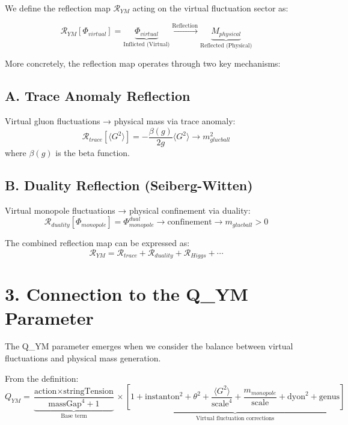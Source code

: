 \documentclass[11pt]{article}
\begin{document}
We define the reflection map $\mathcal{R}_{YM}$ acting on the virtual fluctuation sector as:

\[
\mathcal{R}_{YM}[\Phi_{virtual}] = \underbrace{\Phi_{virtual}}_{\text{Inflicted (Virtual)}} \xrightarrow{\text{Reflection}} \underbrace{M_{physical}}_{\text{Reflected (Physical)}}
\]

More concretely, the reflection map operates through two key mechanisms:

\subsection{A. Trace Anomaly Reflection}
Virtual gluon fluctuations → physical mass via trace anomaly:
\[
\mathcal{R}_{trace}[\langle G^2 \rangle] = -\frac{\beta(g)}{2g} \langle G^2 \rangle \rightarrow m_{glueball}^2
\]
where $\beta(g)$ is the beta function.

\subsection{B. Duality Reflection (Seiberg-Witten)}
Virtual monopole fluctuations → physical confinement via duality:
\[
\mathcal{R}_{duality}[\Phi_{monopole}] = \Phi_{monopole}^{dual} \rightarrow \text{confinement} \rightarrow m_{glueball} > 0
\]

The combined reflection map can be expressed as:
\[
\mathcal{R}_{YM} = \mathcal{R}_{trace} + \mathcal{R}_{duality} + \mathcal{R}_{Higgs} + \cdots
\]

\section{3. Connection to the Q_YM Parameter}

The Q_YM parameter emerges when we consider the balance between virtual fluctuations and physical mass generation.

From the definition:
\[
Q_{YM} = \underbrace{\frac{\text{action} \times \text{stringTension}}{\text{massGap}^4 + 1}}_{\text{Base term}} \times \underbrace{\left[1 + \text{instanton}^2 + \theta^2 + \frac{\langle G^2 \rangle}{\text{scale}^4} + \frac{m_{monopole}}{\text{scale}} + \text{dyon}^2 + \text{genus}\right]}_{\text{Virtual fluctuation corrections}}
\]
\end{document}
